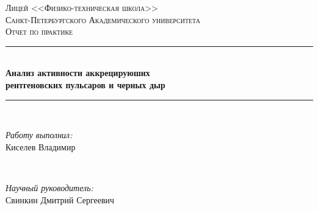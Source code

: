 \begin{titlepage}

\newcommand{\HRule}{\rule{\linewidth}{0.5mm}} %

\center %
 

\textsc{\Large Лицей <<Физико-техническая школа>>}\\[0.3cm] %
\textsc{\Large Санкт-Петербургского Академического университета}\\[3cm]

\textsc{\Large Отчет по практике} 


\HRule \\
{ \huge \bfseries Анализ активности аккрецируюших\\  рентгеновских пульсаров и черных дыр}\\[0.03cm] %
\HRule \\[1.5cm]

 

\begin{minipage}{0.4\textwidth}
\begin{flushleft} \large
\emph{Работу выполнил:}\\
Киселев Владимир%
\end{flushleft}
\end{minipage}
~
\begin{minipage}{0.4\textwidth}
\begin{flushright} \large
\emph{Научный руководитель:} \\
Свинкин Дмитрий Сергеевич %
\end{flushright}
\end{minipage}\\[1cm]



\end{titlepage}
